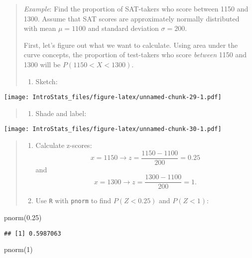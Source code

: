 \documentclass[
]{book}
\newenvironment{Shaded}{\begin{snugshade}}{\end{snugshade}}
\newcommand{\DecValTok}[1]{\textcolor[rgb]{0.00,0.00,0.81}{#1}}
\newcommand{\FloatTok}[1]{\textcolor[rgb]{0.00,0.00,0.81}{#1}}
\newcommand{\FunctionTok}[1]{\textcolor[rgb]{0.00,0.00,0.00}{#1}}
\newcommand{\NormalTok}[1]{#1}
\providecommand{\tightlist}{%
  \setlength{\itemsep}{0pt}\setlength{\parskip}{0pt}}
\begin{document}
\begin{quote}
\emph{Example}: Find the proportion of SAT-takers who score between 1150 and 1300. Assume that SAT scores are approximately normally distributed with mean \(\mu=1100\) and standard deviation \(\sigma = 200\).

First, let's figure out what we want to calculate. Using area under the curve concepts, the proportion of test-takers who score \emph{between} 1150 and 1300 will be \(P(1150 < X < 1300)\).

\begin{enumerate}
\def\labelenumi{\arabic{enumi}.}
\tightlist
\item
  Sketch:
\end{enumerate}
\end{quote}

\texttt{[image: IntroStats\_files/figure-latex/unnamed-chunk-29-1.pdf]}

\begin{quote}
\begin{enumerate}
\def\labelenumi{\arabic{enumi}.}
\setcounter{enumi}{1}
\tightlist
\item
  Shade and label:
\end{enumerate}
\end{quote}

\texttt{[image: IntroStats\_files/figure-latex/unnamed-chunk-30-1.pdf]}

\begin{quote}
\begin{enumerate}
\def\labelenumi{\arabic{enumi}.}
\setcounter{enumi}{2}
\tightlist
\item
  Calculate z-scores: \[x = 1150 \rightarrow z = \frac{1150-1100}{200} = 0.25\] and \[x=1300 \rightarrow z = \frac{1300-1100}{200} = 1.\]
\item
  Use \texttt{R} with \texttt{pnorm} to find \(P(Z < 0.25)\) and \(P(Z < 1)\):
\end{enumerate}
\end{quote}

\begin{Shaded}
\begin{Highlighting}[]
\FunctionTok{pnorm}\NormalTok{(}\FloatTok{0.25}\NormalTok{)}
\end{Highlighting}
\end{Shaded}

\begin{verbatim}
## [1] 0.5987063
\end{verbatim}

\begin{Shaded}
\begin{Highlighting}[]
\FunctionTok{pnorm}\NormalTok{(}\DecValTok{1}\NormalTok{)}
\end{Highlighting}
\end{Shaded}
\end{document}
